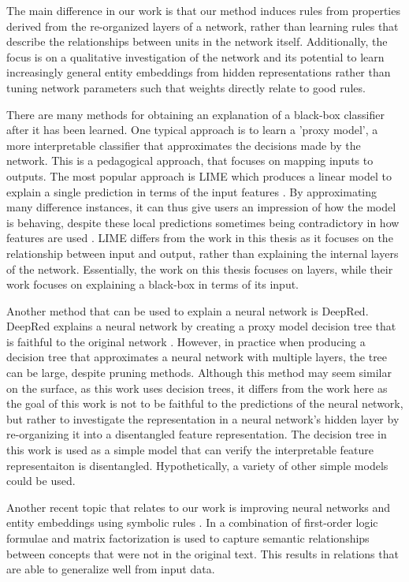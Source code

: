 The main difference in our work is that our method induces rules from properties derived from the re-organized layers of a network, rather than learning rules that describe the relationships between units in the network itself. Additionally, the focus is on a qualitative investigation of the network and its potential to learn increasingly general entity embeddings from hidden representations rather than tuning network parameters such that weights directly relate to good rules. 

There are many methods for obtaining an explanation of a black-box classifier after it has been learned. One typical approach is to learn a 'proxy model', a more interpretable classifier that approximates the decisions made by the network. This is a pedagogical approach, that focuses on mapping inputs to outputs. The most popular approach is  LIME which produces a linear model to explain a single prediction in terms of the input features  \cite{Ribeiro2016}. By approximating many difference instances, it can thus give users an impression of how the model is behaving, despite these local predictions sometimes being contradictory in how features are used \cite{Ribeiro2016a}.  LIME differs from the work in this thesis as it focuses on the relationship between input and output, rather than explaining the internal layers of the network. Essentially, the work on this thesis focuses on layers, while their work focuses on explaining a black-box in terms of its input. 

Another method that can be used to explain a neural network is DeepRed. DeepRed explains a neural network by creating a proxy model decision tree that is faithful to the original network \cite{Zilke2016}. However, in practice when producing a decision tree that approximates a neural network with multiple layers, the tree can be large, despite pruning methods. Although this method may seem similar on the surface, as this work uses decision trees, it differs from the work here as the goal of this work is not to be faithful to the predictions of the neural network, but rather to investigate the representation in a neural network's hidden layer by re-organizing it into a disentangled feature representation. The decision tree in this work is used as a simple  model that can verify the interpretable feature representaiton is disentangled. Hypothetically, a variety of other simple  models could be used.

Another recent topic that relates to our work is improving neural networks and entity embeddings using symbolic rules \cite{Hu2016}. In \cite{Rocktaschel2015} a combination of first-order logic formulae and matrix factorization is used to capture semantic relationships between concepts that were not in the original text. This results in relations that are able to generalize well from input data.  

